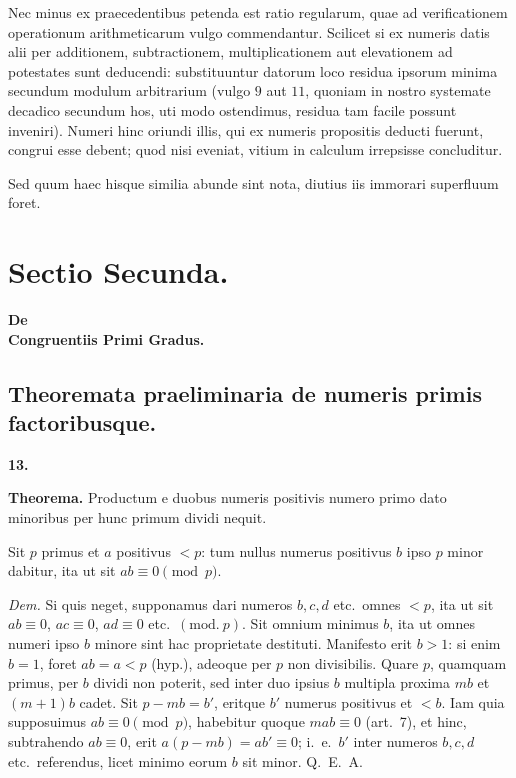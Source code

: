 \documentclass[12pt,a4paper]{article}
\theoremstyle{plain}
\theoremstyle{definition}
\theoremstyle{remark}
\begin{document}
Nec minus ex praecedentibus petenda est ratio regularum, quae ad verificationem operationum arithmeticarum vulgo commendantur. Scilicet si ex numeris datis alii per additionem, subtractionem, multiplicationem aut elevationem ad potestates sunt deducendi: substituuntur datorum loco residua ipsorum minima secundum modulum arbitrarium (vulgo $9$ aut $11$, quoniam in nostro systemate decadico secundum hos, uti modo ostendimus, residua tam facile possunt inveniri). Numeri hinc oriundi illis, qui ex numeris propositis deducti fuerunt, congrui esse debent; quod nisi eveniat, vitium in calculum irrepsisse concluditur.

Sed quum haec hisque similia abunde sint nota, diutius iis immorari superfluum foret.
\clearpage

\section*{Sectio Secunda.}
\begin{center}
\textbf{\large De}\\[0.5em]
\textbf{\large Congruentiis Primi Gradus.}
\end{center}

\subsection*{Theoremata praeliminaria de numeris primis factoribusque.}

\textbf{13.}

\textbf{Theorema.} Productum e duobus numeris positivis numero primo dato minoribus per hunc primum dividi nequit.

Sit $p$ primus et $a$ positivus $< p$: tum nullus numerus positivus $b$ ipso $p$ minor dabitur, ita ut sit $ab \equiv 0 \pmod{p}$.

\textit{Dem.} Si quis neget, supponamus dari numeros $b, c, d$ etc.\ omnes $< p$, ita ut sit $ab \equiv 0$, $ac \equiv 0$, $ad \equiv 0$ etc.\ $(\text{mod.}\ p)$. Sit omnium minimus $b$, ita ut omnes numeri ipso $b$ minore sint hac proprietate destituti. Manifesto erit $b > 1$: si enim $b = 1$, foret $ab = a < p$ (hyp.), adeoque per $p$ non divisibilis. Quare $p$, quamquam primus, per $b$ dividi non poterit, sed inter duo ipsius $b$ multipla proxima $mb$ et $(m+1)b$ cadet. Sit $p - mb = b'$, eritque $b'$ numerus positivus et $< b$. Iam quia supposuimus $ab \equiv 0 \pmod{p}$, habebitur quoque $mab \equiv 0$ (art.~7), et hinc, subtrahendo $ab \equiv 0$, erit $a(p - mb) = ab' \equiv 0$; i.~e.\ $b'$ inter numeros $b, c, d$ etc.\ referendus, licet minimo eorum $b$ sit minor. Q.~E.~A.
\end{document}
